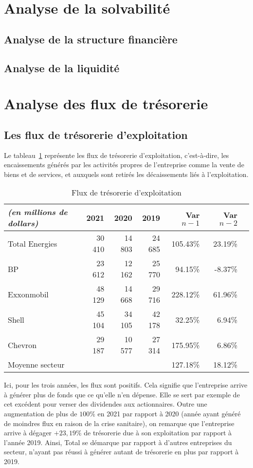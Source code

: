 \documentclass[12pt]{article}
\begin{document}
\section{Analyse de la solvabilité}
\subsection{Analyse de la structure financière}
\subsection{Analyse de la liquidité}

\newpage
\section{Analyse des flux de trésorerie}
\subsection{Les flux de trésorerie d'exploitation}
Le tableau~\ref{table:fluxActivite} représente les flux de trésorerie d'exploitation, c'est-à-dire, les encaissements générés par les activités propres de l'entreprise comme la vente de biens et de services, et auxquels sont retirés les décaissements liés à l'exploitation.
\begin{table}[H]
    \sffamily
    \centering
    \caption{Flux de trésorerie d'exploitation}
    \label{table:fluxActivite}
    \begin{tabular}{l*{1}{rrrrrr}}
        \toprule
        \textit{(en millions de dollars)} & \textbf{2021} & 2020 & 2019 & Var $n-1$ & Var $n-2$ \\
        \midrule
        Total Energies & 30 410 & 14 803 & 24 685 & 105.43\% & 23.19\% \\ 
        \midrule
        BP & 23 612 & 12 162 & 25 770 & 94.15\% & -8.37\% \\ 
        Exxonmobil & 48 129 & 14 668 & 29 716 & 228.12\% & 61.96\% \\ 
        Shell & 45 104 & 34 105 & 42 178 & 32.25\% & 6.94\% \\ 
        Chevron & 29 187 & 10 577 & 27 314 & 175.95\% & 6.86\% \\ 
    \midrule
        Moyenne secteur & ~ & ~ & ~ & 127.18\% & 18.12\% \\
    \bottomrule
    \end{tabular}
\end{table}
Ici, pour les trois années, les flux sont positifs. Cela signifie que l'entreprise arrive à générer plus de fonds que ce qu'elle n'en dépense. Elle se sert par exemple de cet excédent pour verser des dividendes aux actionnaires. Outre une augmentation de plus de $100\%$ en 2021 par rapport à 2020 (année ayant généré de moindres flux en raison de la crise sanitaire), on remarque que l'entreprise arrive à dégager $+23,19\%$ de trésorerie due à son exploitation par rapport à l'année 2019. Ainsi, Total se démarque par rapport à d'autres entreprises du secteur, n'ayant pas réussi à générer autant de trésorerie en plus par rapport à 2019.
\end{document}
